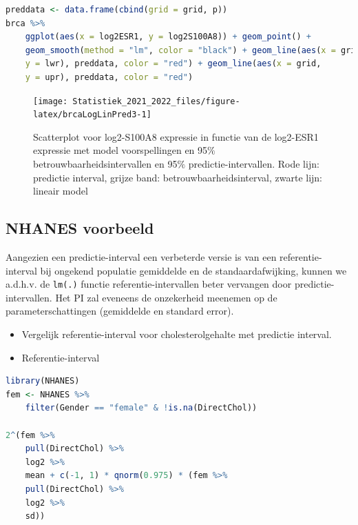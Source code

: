 \documentclass[
  12pt,dutch,coursenotes]{book}
\newcommand{\passthrough}[1]{#1}
\theoremstyle{definition}
\theoremstyle{definition}
\theoremstyle{definition}
\theoremstyle{definition}
\theoremstyle{remark}
\begin{document}
\begin{lstlisting}[language=R]
preddata <- data.frame(cbind(grid = grid, p))
brca %>%
    ggplot(aes(x = log2ESR1, y = log2S100A8)) + geom_point() +
    geom_smooth(method = "lm", color = "black") + geom_line(aes(x = grid,
    y = lwr), preddata, color = "red") + geom_line(aes(x = grid,
    y = upr), preddata, color = "red")
\end{lstlisting}

\begin{figure}

{\centering \texttt{[image: Statistiek\_2021\_2022\_files/figure-latex/brcaLogLinPred3-1]} 

}

\caption{Scatterplot voor log2-S100A8 expressie in functie van de log2-ESR1 expressie met model voorspellingen en 95$\%$ betrouwbaarheidsintervallen en 95$\%$ predictie-intervallen. Rode lijn: predictie interval, grijze band: betrouwbaarheidsinterval, zwarte lijn: lineair model}\label{fig:brcaLogLinPred3}
\end{figure}

\hypertarget{nhanes-voorbeeld}{%
\subsection{NHANES voorbeeld}\label{nhanes-voorbeeld}}

Aangezien een predictie-interval een verbeterde versie is van een referentie-interval bij ongekend populatie gemiddelde en de standaardafwijking, kunnen we a.d.h.v. de \passthrough{\lstinline!lm(.)!} functie referentie-intervallen beter vervangen door predictie-intervallen.
Het PI zal eveneens de onzekerheid meenemen op de parameterschattingen (gemiddelde en standard error).

\begin{itemize}
\item
  Vergelijk referentie-interval voor cholesterolgehalte met predictie interval.
\item
  Referentie-interval
\end{itemize}

\begin{lstlisting}[language=R]
library(NHANES)
fem <- NHANES %>%
    filter(Gender == "female" & !is.na(DirectChol))

2^(fem %>%
    pull(DirectChol) %>%
    log2 %>%
    mean + c(-1, 1) * qnorm(0.975) * (fem %>%
    pull(DirectChol) %>%
    log2 %>%
    sd))
\end{lstlisting}
\end{document}
